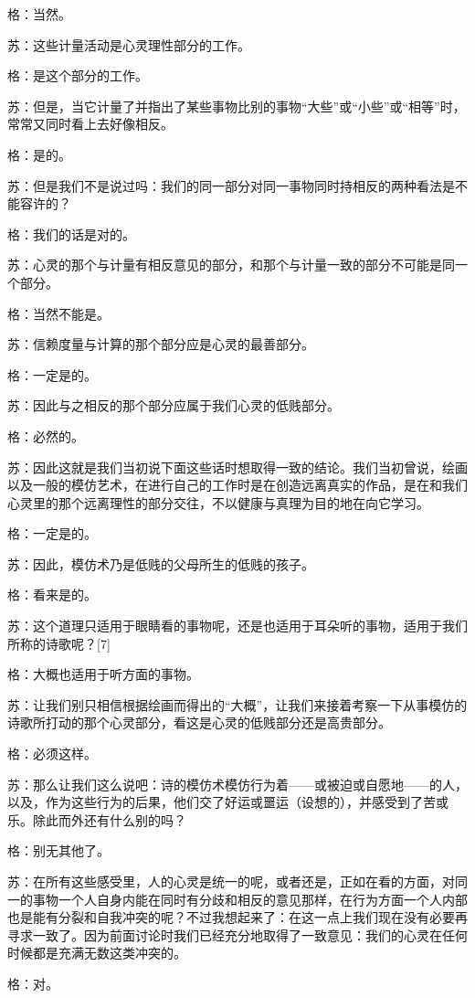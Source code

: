 \documentclass[12pt,oneside]{book}
\begin{document}
格：当然。

苏：这些计量活动是心灵理性部分的工作。

格：是这个部分的工作。

苏：但是，当它计量了并指出了某些事物比别的事物“大些”或“小些”或“相等”时，常常又同时看上去好像相反。

格：是的。

苏：但是我们不是说过吗：我们的同一部分对同一事物同时持相反的两种看法是不能容许的？

格：我们的话是对的。

苏：心灵的那个与计量有相反意见的部分，和那个与计量一致的部分不可能是同一个部分。

格：当然不能是。

苏：信赖度量与计算的那个部分应是心灵的最善部分。

格：一定是的。

苏：因此与之相反的那个部分应属于我们心灵的低贱部分。

格：必然的。

苏：因此这就是我们当初说下面这些话时想取得一致的结论。我们当初曾说，绘画以及一般的模仿艺术，在进行自己的工作时是在创造远离真实的作品，是在和我们心灵里的那个远离理性的部分交往，不以健康与真理为目的地在向它学习。

格：一定是的。

苏：因此，模仿术乃是低贱的父母所生的低贱的孩子。

格：看来是的。

苏：这个道理只适用于眼睛看的事物呢，还是也适用于耳朵听的事物，适用于我们所称的诗歌呢？[7]

格：大概也适用于听方面的事物。

苏：让我们别只相信根据绘画而得出的“大概”，让我们来接着考察一下从事模仿的诗歌所打动的那个心灵部分，看这是心灵的低贱部分还是高贵部分。

格：必须这样。

苏：那么让我们这么说吧：诗的模仿术模仿行为着——或被迫或自愿地——的人，以及，作为这些行为的后果，他们交了好运或噩运（设想的），并感受到了苦或乐。除此而外还有什么别的吗？

格：别无其他了。

苏：在所有这些感受里，人的心灵是统一的呢，或者还是，正如在看的方面，对同一的事物一个人自身内能在同时有分歧和相反的意见那样，在行为方面一个人内部也是能有分裂和自我冲突的呢？不过我想起来了：在这一点上我们现在没有必要再寻求一致了。因为前面讨论时我们已经充分地取得了一致意见：我们的心灵在任何时候都是充满无数这类冲突的。

格：对。
\end{document}
